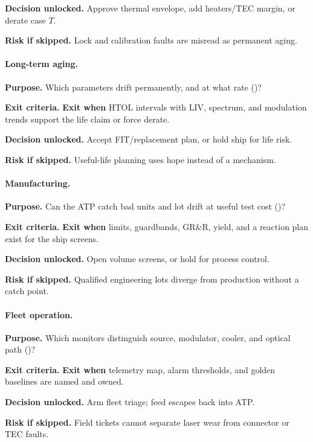 \textbf{Decision unlocked.}
Approve thermal envelope, add heaters/TEC margin, or derate case $T$.

\textbf{Risk if skipped.}
Lock and calibration faults are misread as permanent aging.

\paragraph{Long-term aging.}

\textbf{Purpose.}
Which parameters drift permanently, and at what rate
()?

\textbf{Exit criteria.}
\textbf{Exit when} HTOL intervals with LIV, spectrum, and modulation trends
support the life claim or force derate.

\textbf{Decision unlocked.}
Accept FIT/replacement plan, or hold ship for life risk.

\textbf{Risk if skipped.}
Useful-life planning uses hope instead of a mechanism.

\paragraph{Manufacturing.}

\textbf{Purpose.}
Can the ATP catch bad units and lot drift at useful test cost
()?

\textbf{Exit criteria.}
\textbf{Exit when} limits, guardbands, GR\&R, yield, and a reaction plan
exist for the ship screens.

\textbf{Decision unlocked.}
Open volume screens, or hold for process control.

\textbf{Risk if skipped.}
Qualified engineering lots diverge from production without a catch point.

\paragraph{Fleet operation.}

\textbf{Purpose.}
Which monitors distinguish source, modulator, cooler, and optical path
()?

\textbf{Exit criteria.}
\textbf{Exit when} telemetry map, alarm thresholds, and golden baselines are
named and owned.

\textbf{Decision unlocked.}
Arm fleet triage; feed escapes back into ATP.

\textbf{Risk if skipped.}
Field tickets cannot separate laser wear from connector or TEC faults.

